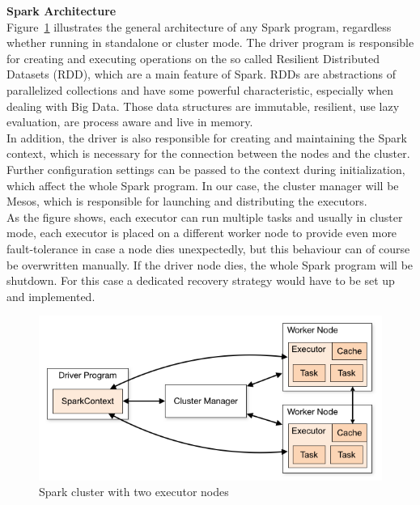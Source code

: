 \textbf{Spark Architecture}\\
Figure~\ref{fig:spark_cluster_overview} illustrates the general architecture of any Spark program, regardless whether running in standalone or cluster mode.
The driver program is responsible for creating and executing operations on the so called Resilient Distributed Datasets (RDD), which are a main feature of Spark.
RDDs are abstractions of parallelized collections and have some powerful characteristic, especially when dealing with Big Data.
Those data structures are immutable, resilient, use lazy evaluation, are process aware and live in memory.\\
In addition, the driver is also responsible for creating and maintaining the Spark context, which is necessary for the connection between the nodes and the cluster.
Further configuration settings can be passed to the context during initialization, which affect the whole Spark program.
In our case, the cluster manager will be Mesos, which is responsible for launching and distributing the executors.\\
As the figure shows, each executor can run multiple tasks and usually in cluster mode, each executor is placed on a different worker node to provide even more fault-tolerance in case a node dies unexpectedly, but this behaviour can of course be overwritten manually.
If the driver node dies, the whole Spark program will be shutdown.
For this case a dedicated recovery strategy would have to be set up and implemented.

\begin{figure}[!htbp]
  \centering
  \includegraphics[keepaspectratio=true,scale=0.6]{img/spark_cluster_overview}
    \caption{Spark cluster with two executor nodes \cite{apache_spark}}
  \label{fig:spark_cluster_overview}
\end{figure}


